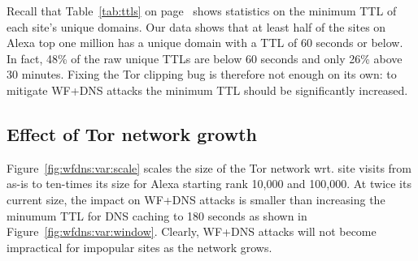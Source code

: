 Recall that Table~\ref{tab:ttls} on page~\pageref{tab:ttls} shows statistics on
the minimum TTL of each site's unique domains. Our data shows that at least
half of the sites on Alexa top one million has a unique domain with a TTL of
60 seconds or below.
In fact, 48\% of the raw unique TTLs are below 60 seconds and only
26\% above 30 minutes. Fixing the Tor clipping bug is therefore not enough on
its own: to mitigate WF+DNS attacks the minimum TTL should be significantly
increased.

\subsection{Effect of Tor network growth}
Figure~\ref{fig:wfdns:var:scale} scales the size of the Tor network wrt. site
visits from as-is to ten-times its size for Alexa starting rank 10,000 and
100,000. At twice its current size, the impact on WF+DNS attacks is smaller than
increasing the minumum TTL for DNS caching to 180 seconds as shown in
Figure~\ref{fig:wfdns:var:window}. Clearly, WF+DNS attacks will not become
impractical for impopular sites as the network grows.

